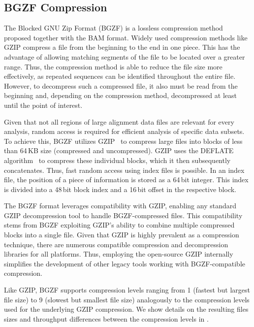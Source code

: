 \subsection{BGZF Compression} \label{bgzf}
The Blocked GNU Zip Format (BGZF) is a lossless compression method proposed together with the BAM format. Widely used compression methods like GZIP compress a file from the beginning to the end in one piece. This has the advantage of allowing matching segments of the file to be located over a greater range. Thus, the compression method is able to reduce the file size more effectively, as repeated sequences can be identified throughout the entire file. However, to decompress such a compressed file, it also must be read from the beginning and, depending on the compression method, decompressed at least until the point of interest. 

Given that not all regions of large alignment data files are relevant for every analysis, random access is required for efficient analysis of specific data subsets. To achieve this, BGZF utilizes GZIP~\cite{gzip} to compress large files into blocks of less than 64\,KB size (compressed and uncompressed). GZIP uses the DEFLATE algorithm~\cite{deflate} to compress these individual blocks, which it then subsequently concatenates. Thus, fast random access using index files is possible. In an index file, the position of a piece of information is stored as a 64\,bit integer. This index is divided into a 48\,bit block index and a 16\,bit offset in the respective block.

The BGZF format leverages compatibility with GZIP, enabling any standard GZIP decompression tool to handle BGZF-compressed files. This compatibility stems from BGZF exploiting GZIP's ability to combine multiple compressed blocks into a single file. Given that GZIP is highly prevalent as a compression technique, there are numerous compatible compression and decompression libraries for all platforms. Thus, employing the open-source GZIP internally simplifies the development of other legacy tools working with BGZF-compatible compression.  

Like GZIP, BGZF supports compression levels ranging from 1 (fastest but largest file size) to 9 (slowest but smallest file size) analogously to the compression levels used for the underlying GZIP compression. We show details on the resulting files sizes and throughput differences between the compression levels in .

